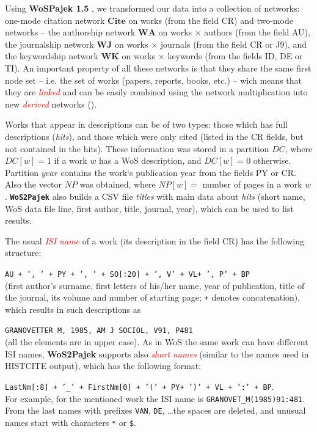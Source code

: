 \documentclass[11pt]{article} %
\newcommand{\WoSPajek}{\texttt{\textbf{WoS2Pajek}}\xspace}
\newcommand{\keyw}[1]{\textcolor{red}{\emph{#1}}}
\newcommand{\WA}{\mathbf{W\!\!A}}
\newcommand{\WK}{\mathbf{W\!K}}
\newcommand{\WJ}{\mathbf{W\!J}}
\newcommand{\Ci}{\mathbf{Cite}}
\newcommand{\NP}{N\!P}
\begin{document}
Using \textbf{WoSPajek 1.5} \citep{wos2pajek}, we transformed our data into a collection of networks: one-mode citation network $\Ci$ on works (from the field CR) and two-mode networks -- the authorship network $\WA$ on works $\times$ authors  (from the field AU),  the journalship network $\WJ$ on  works $\times$ journals  (from the field CR or J9), and the keywordship network $\WK$ on works  $\times$ keywords (from the fields ID, DE or TI). An important property of all these networks is that they share the same first node set -- i.e. the set of works (papers, reports, books, etc.) -- wich means that they are \keyw{linked} and can be easily combined using the network multiplication into new \keyw{derived}  networks (\cite{Understand}). \medskip

Works that appear in descriptions can be of two types: those which has full descriptions (\textit{hits}), and those which were only cited (listed in the CR fields, but not contained in the hits). These information was stored in a partition $DC$, where $DC[w] = 1$ if a work $w$ has a WoS description, and $DC[w] = 0$ otherwise. Partition $year$ contains the work`s publication year from the fields PY or CR. Also the vector $\NP$ was obtained, where $\NP[w] =$ number of pages in a work $w$. \WoSPajek also builds a CSV file \textit{titles} with main data about \textit{hits} (short name, WoS data file line, first author, title, journal, year), which can be used to list results. \medskip 

The usual \keyw{ISI name} of a work (its description in the field CR) has the following structure: \smallskip
 
 \texttt {AU {+ ', ' +} PY \texttt{+ ', ' +} SO[:20] \texttt{+ ', V' +} VL\texttt{+ ', P' +} BP}  \smallskip\\
(first author's surname, first letters of his/her name, year of publication, title of the journal, its volume and number of starting page; \texttt{+} denotes concatenation), which results in such descriptions as \smallskip

\texttt{GRANOVETTER M, 1985, AM J SOCIOL, V91, P481}\smallskip\\  (all the elements are in upper case). As in WoS the same work can have different ISI names, \textbf{WoS2Pajek} supports also \keyw{short names} (similar to the names used in HISTCITE output), which has the following format:\smallskip

 \texttt {LastNm[:8] \texttt{+ '\_' +} FirstNm[0] \texttt{+ '(' +} PY\texttt{+ ')' +} VL \texttt{+ ':' +} BP}. \smallskip\\ For example, for the mentioned work the ISI name is \texttt{GRANOVET\_M(1985)91:481}. From the last names with prefixes \texttt{VAN}, \texttt{DE}, \ldots the spaces are deleted, and unusual names start with characters \texttt{*} or \texttt{\$}.\medskip 
\end{document}
